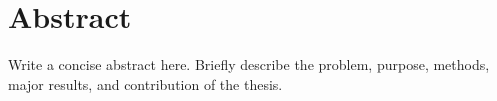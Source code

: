 \chapter*{Abstract}

Write a concise abstract here. Briefly describe the problem, purpose, methods,
major results, and contribution of the thesis.

\cleardoublepage
